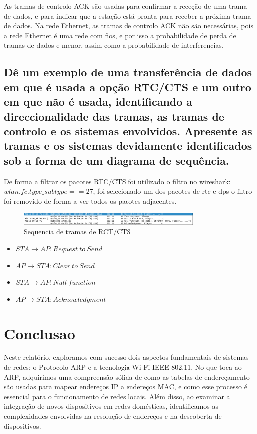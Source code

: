 \documentclass{article}
\begin{document}
As tramas de controlo ACK são usadas para confirmar a receção de uma trama de dados, e para indicar que a estação está pronta para receber a próxima trama de dados.
Na rede Ethernet, as tramas de controlo ACK não são necessárias, pois a rede Ethernet é uma rede com fios, e por isso a probabilidade de perda de tramas de dados e menor, assim como a probabilidade de interferencias.

\subsection{Dê um exemplo de uma transferência de dados em que é usada a opção RTC/CTS
e um outro em que não é usada, identificando a direccionalidade das tramas, as
tramas de controlo e os sistemas envolvidos. Apresente as tramas e os sistemas
devidamente identificados sob a forma de um diagrama de sequência.}

De forma a filtrar os pacotes RTC/CTS foi utilizado o filtro no wireshark: \(wlan.fc.type\_subtype == 27\), foi selecionado um dos pacotes de rtc e dps o filtro foi removido de forma a ver todos os pacotes adjacentes.

\begin{figure}[h]
    \centering
    \includegraphics[width=0.8\textwidth]{images/rct.png}
    \caption{\label{fig:rct}Sequencia de tramas de RCT/CTS}
\end{figure}

\begin{itemize}
    \item \(STA \rightarrow AP: Request\ to\ Send\)
    \item \(AP \rightarrow STA: Clear\ to\ Send\)
    \item \(STA \rightarrow AP: Null\ function\)
    \item \(AP \rightarrow STA: Acknowledgment\)
\end{itemize}

\section{Conclusao}

Neste relatório, exploramos com sucesso dois aspectos fundamentais de sistemas de redes: o Protocolo ARP e a tecnologia Wi-Fi IEEE 802.11. No que toca ao ARP, adquirimos uma compreensão sólida de como as tabelas de endereçamento são usadas para mapear endereços IP a endereços MAC, e como esse processo é essencial para o funcionamento de redes locais. Além disso, ao examinar a integração de novos dispositivos em redes domésticas, identificamos as complexidades envolvidas na resolução de endereços e na descoberta de dispositivos.
\end{document}
